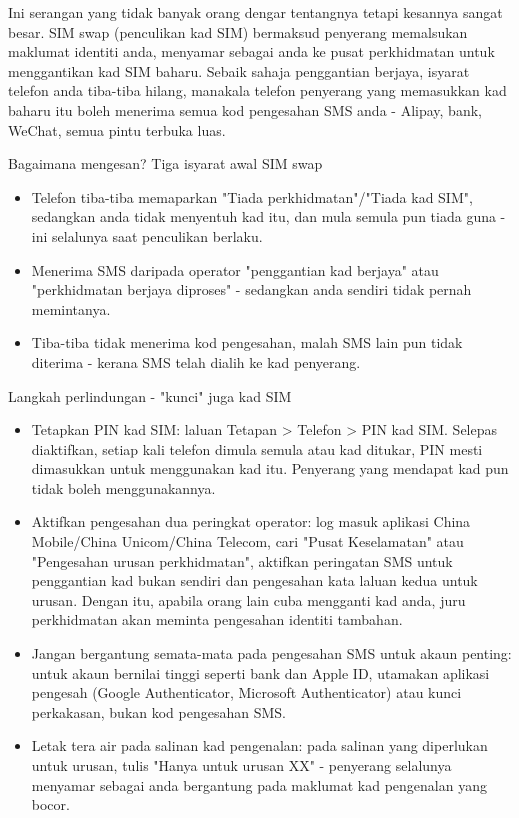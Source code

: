 
Ini serangan yang tidak banyak orang dengar tentangnya tetapi kesannya sangat besar. SIM swap (penculikan kad SIM) bermaksud penyerang memalsukan maklumat identiti anda, menyamar sebagai anda ke pusat perkhidmatan untuk menggantikan kad SIM baharu. Sebaik sahaja penggantian berjaya, isyarat telefon anda tiba-tiba hilang, manakala telefon penyerang yang memasukkan kad baharu itu boleh menerima semua kod pengesahan SMS anda - Alipay, bank, WeChat, semua pintu terbuka luas.

\begin{tcbinfo}{Bagaimana mengesan? Tiga isyarat awal SIM swap}
\begin{itemize}
  \item Telefon tiba-tiba memaparkan "Tiada perkhidmatan"/"Tiada kad SIM", sedangkan anda tidak menyentuh kad itu, dan mula semula pun tiada guna - ini selalunya saat penculikan berlaku.
  \item Menerima SMS daripada operator "penggantian kad berjaya" atau "perkhidmatan berjaya diproses" - sedangkan anda sendiri tidak pernah memintanya.
  \item Tiba-tiba tidak menerima kod pengesahan, malah SMS lain pun tidak diterima - kerana SMS telah dialih ke kad penyerang.
\end{itemize}

\end{tcbinfo}

\begin{tcbwarn}{Langkah perlindungan - "kunci" juga kad SIM}
\begin{itemize}
  \item Tetapkan PIN kad SIM: laluan Tetapan > Telefon > PIN kad SIM. Selepas diaktifkan, setiap kali telefon dimula semula atau kad ditukar, PIN mesti dimasukkan untuk menggunakan kad itu. Penyerang yang mendapat kad pun tidak boleh menggunakannya.
  \item Aktifkan pengesahan dua peringkat operator: log masuk aplikasi China Mobile/China Unicom/China Telecom, cari "Pusat Keselamatan" atau "Pengesahan urusan perkhidmatan", aktifkan peringatan SMS untuk penggantian kad bukan sendiri dan pengesahan kata laluan kedua untuk urusan. Dengan itu, apabila orang lain cuba mengganti kad anda, juru perkhidmatan akan meminta pengesahan identiti tambahan.
  \item Jangan bergantung semata-mata pada pengesahan SMS untuk akaun penting: untuk akaun bernilai tinggi seperti bank dan Apple ID, utamakan aplikasi pengesah (Google Authenticator, Microsoft Authenticator) atau kunci perkakasan, bukan kod pengesahan SMS.
  \item Letak tera air pada salinan kad pengenalan: pada salinan yang diperlukan untuk urusan, tulis "Hanya untuk urusan XX" - penyerang selalunya menyamar sebagai anda bergantung pada maklumat kad pengenalan yang bocor.
\end{itemize}

\end{tcbwarn}

